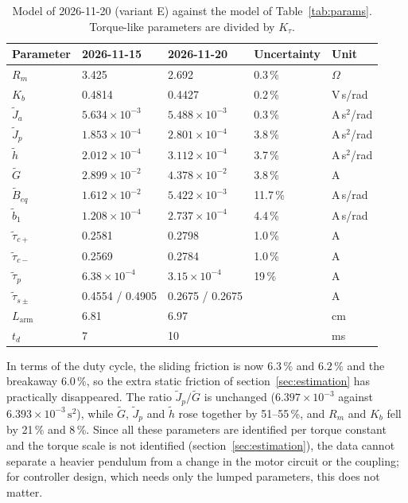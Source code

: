 \documentclass[a4paper,11pt]{article}
\newcommand{\La}{L_{\mathrm{arm}}}
\begin{document}
\begin{table}[h]
\centering
\caption{Model of 2026-11-20 (variant E) against the model of Table~\ref{tab:params}. Torque-like parameters are divided by $K_\tau$.}
\label{tab:reid_params}
\small
\begin{tabular}{@{}lllll@{}}
\toprule
Parameter & 2026-11-15 & 2026-11-20 & Uncertainty & Unit \\
\midrule
$R_m$ & 3.425 & 2.692 & 0.3\,\% & $\Omega$ \\
$K_b$ & 0.4814 & 0.4427 & 0.2\,\% & V\,s/rad \\
$\tilde J_a$ & $5.634\times10^{-3}$ & $5.488\times10^{-3}$ & 0.3\,\% & A\,s$^2$/rad \\
$\tilde J_p$ & $1.853\times10^{-4}$ & $2.801\times10^{-4}$ & 3.8\,\% & A\,s$^2$/rad \\
$\tilde h$ & $2.012\times10^{-4}$ & $3.112\times10^{-4}$ & 3.7\,\% & A\,s$^2$/rad \\
$\tilde G$ & $2.899\times10^{-2}$ & $4.378\times10^{-2}$ & 3.8\,\% & A \\
$\tilde B_{eq}$ & $1.612\times10^{-2}$ & $5.422\times10^{-3}$ & 11.7\,\% & A\,s/rad \\
$\tilde b_1$ & $1.208\times10^{-4}$ & $2.737\times10^{-4}$ & 4.4\,\% & A\,s/rad \\
$\tilde\tau_{c+}$ & 0.2581 & 0.2798 & 1.0\,\% & A \\
$\tilde\tau_{c-}$ & 0.2569 & 0.2784 & 1.0\,\% & A \\
$\tilde\tau_p$ & $6.38\times10^{-4}$ & $3.15\times10^{-4}$ & 19\,\% & A \\
$\tilde\tau_{s\pm}$ & 0.4554 / 0.4905 & 0.2675 / 0.2675 & & A \\
\midrule
$\La$ & 6.81 & 6.97 & & cm \\
$t_d$ & 7 & 10 & & ms \\
\bottomrule
\end{tabular}
\end{table}

In terms of the duty cycle, the sliding friction is now $6.3\,\%$ and $6.2\,\%$ and the breakaway $6.0\,\%$, so the extra static friction of section~\ref{sec:estimation} has practically disappeared. The ratio $\tilde J_p/\tilde G$ is unchanged ($6.397\times10^{-3}$ against $6.393\times10^{-3}\,\mathrm{s^2}$), while $\tilde G$, $\tilde J_p$ and $\tilde h$ rose together by 51--55\,\%, and $R_m$ and $K_b$ fell by 21\,\% and 8\,\%. Since all these parameters are identified per torque constant and the torque scale is not identified (section~\ref{sec:estimation}), the data cannot separate a heavier pendulum from a change in the motor circuit or the coupling; for controller design, which needs only the lumped parameters, this does not matter.
\end{document}
